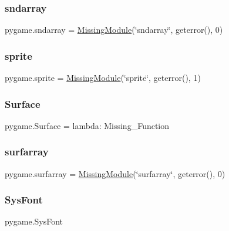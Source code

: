 \subsubsection{\texorpdfstring{sndarray}{sndarray}}
{\footnotesize\ttfamily pygame.\+sndarray = \hyperlink{classpygame_1_1_missing_module}{Missing\+Module}(\char`\"{}sndarray\char`\"{}, geterror(), 0)}

\mbox{\label{namespacepygame_aa4b7d2ae8175850dd21d2b548f184cb8}} 
\subsubsection{\texorpdfstring{sprite}{sprite}}
{\footnotesize\ttfamily pygame.\+sprite = \hyperlink{classpygame_1_1_missing_module}{Missing\+Module}(\char`\"{}sprite\char`\"{}, geterror(), 1)}

\mbox{\label{namespacepygame_af987790424fd0631c88919974993d66e}} 
\subsubsection{\texorpdfstring{Surface}{Surface}}
{\footnotesize\ttfamily pygame.\+Surface = lambda\+: Missing\+\_\+\+Function}

\mbox{\label{namespacepygame_aee8717e80ca1983db610b2c66b177f1e}} 
\subsubsection{\texorpdfstring{surfarray}{surfarray}}
{\footnotesize\ttfamily pygame.\+surfarray = \hyperlink{classpygame_1_1_missing_module}{Missing\+Module}(\char`\"{}surfarray\char`\"{}, geterror(), 0)}

\mbox{\label{namespacepygame_aa625a5d1e79bdc9c429ff8b6949f239a}} 
\subsubsection{\texorpdfstring{Sys\+Font}{SysFont}}
{\footnotesize\ttfamily pygame.\+Sys\+Font}

